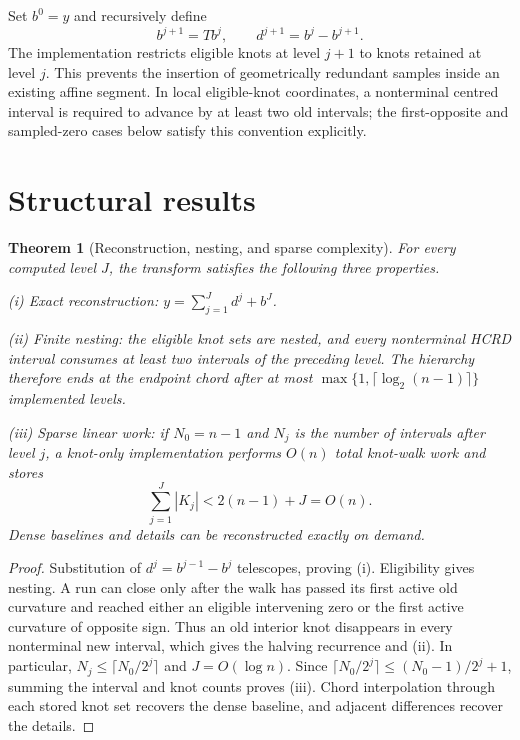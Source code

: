 \documentclass[review,onefignum,onetabnum]{siamonline250211}
\newtheorem{theorem}{Theorem}
\begin{document}
Set $b^0=y$ and recursively define
\begin{equation}
b^{j+1}=Tb^j,\qquad d^{j+1}=b^j-b^{j+1}.
\end{equation}
The implementation restricts eligible knots at level $j+1$ to knots retained
at level $j$.  This prevents the insertion of geometrically redundant samples
inside an existing affine segment.
In local eligible-knot coordinates, a nonterminal centred interval is required
to advance by at least two old intervals; the first-opposite and sampled-zero
cases below satisfy this convention explicitly.

\section{Structural results}
\begin{theorem}[Reconstruction, nesting, and sparse complexity]
\label{thm:structure}
For every computed level $J$, the transform satisfies the following three
properties.

\noindent\emph{(i) Exact reconstruction:}
$y=\sum_{j=1}^{J}d^j+b^J$.

\noindent\emph{(ii) Finite nesting:} the eligible knot sets are nested, and
every nonterminal HCRD interval consumes at least two intervals of the
preceding level.  The hierarchy therefore ends at the endpoint chord after at
most $\max\{1,\lceil\log_2(n-1)\rceil\}$ implemented levels.

\noindent\emph{(iii) Sparse linear work:} if $N_0=n-1$ and $N_j$ is the
number of intervals after level $j$, a knot-only implementation performs
$O(n)$ total knot-walk work and stores
\begin{equation}
\sum_{j=1}^{J}|K_j|<2(n-1)+J=O(n).
\end{equation}
Dense baselines and details can be reconstructed exactly on demand.
\end{theorem}
\begin{proof}
Substitution of $d^j=b^{j-1}-b^j$ telescopes, proving (i).  Eligibility gives
nesting.  A run can close only after the walk has passed its first active old
curvature and reached either an eligible intervening zero or the first active
curvature of opposite sign.  Thus an old interior knot disappears in every
nonterminal new interval, which gives the halving recurrence and (ii).  In
particular, $N_j\le\lceil N_0/2^j\rceil$ and $J=O(\log n)$.  Since
$\lceil N_0/2^j\rceil\le (N_0-1)/2^j+1$, summing the interval and knot counts
proves (iii).  Chord interpolation through each stored knot set recovers the
dense baseline, and adjacent differences recover the details.
\end{proof}
\end{document}
